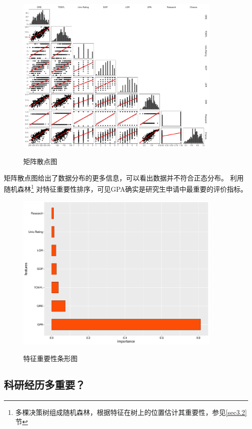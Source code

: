 \documentclass[12pt, UTF8, a4paper]{ctexart}
\begin{document}
\begin{figure}[htb]
    \centering
    \includegraphics[width=4in, keepaspectratio]{./pic/matplot.pdf}\\
    \caption{矩阵散点图}
\end{figure}

矩阵散点图给出了数据分布的更多信息，可以看出数据并不符合正态分布。
利用随机森林\footnote{多棵决策树组成随机森林，根据特征在树上的位置估计其重要性，参见\ref{sec3.2}节}
对特征重要性排序，可见GPA确实是研究生申请中最重要的评价指标。

\begin{figure}[htb]
    \centering
    \includegraphics[width=4in, keepaspectratio]{./pic/rf.pdf}\\
    \caption{特征重要性条形图}
\end{figure}

\subsection{科研经历多重要？}
\end{document}
